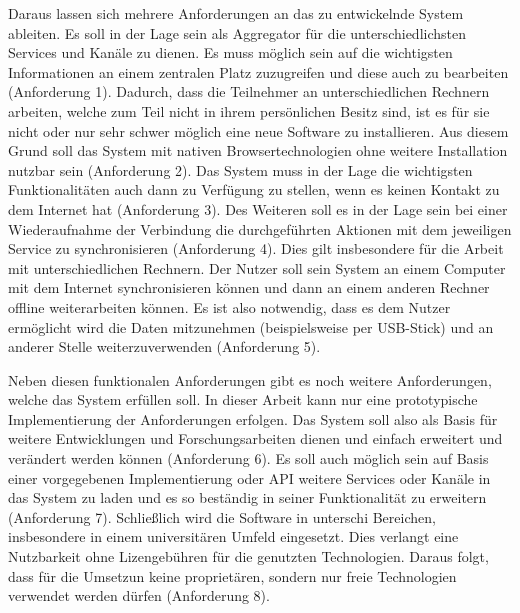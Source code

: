 Daraus lassen sich mehrere Anforderungen an das zu entwickelnde System ableiten. Es soll in der Lage sein als Aggregator für die unterschiedlichsten Services und Kanäle zu dienen. Es muss möglich sein auf die wichtigsten Informationen an einem zentralen Platz zuzugreifen und diese auch zu bearbeiten (Anforderung 1). Dadurch, dass die Teilnehmer an unterschiedlichen Rechnern arbeiten, welche zum Teil nicht in ihrem persönlichen Besitz sind, ist es für sie nicht oder nur sehr schwer möglich eine neue Software zu installieren. Aus diesem Grund soll das System mit nativen Browsertechnologien ohne weitere Installation nutzbar sein (Anforderung 2). Das System muss in der Lage die wichtigsten Funktionalitäten auch dann zu Verfügung zu stellen, wenn es keinen Kontakt zu dem Internet hat (Anforderung 3). Des Weiteren soll es in der Lage sein bei einer Wiederaufnahme der Verbindung die durchgeführten Aktionen mit dem jeweiligen Service zu synchronisieren (Anforderung 4). Dies gilt insbesondere für die Arbeit mit unterschiedlichen Rechnern. Der Nutzer soll sein System an einem Computer mit dem Internet synchronisieren können und dann an einem anderen Rechner offline weiterarbeiten können. Es ist also notwendig, dass es dem Nutzer ermöglicht wird die Daten mitzunehmen (beispielsweise per USB-Stick) und an anderer Stelle weiterzuverwenden (Anforderung 5). 

Neben diesen funktionalen Anforderungen gibt es noch weitere Anforderungen, welche das System erfüllen soll. In dieser Arbeit kann nur eine prototypische Implementierung der Anforderungen erfolgen. Das System soll also als Basis für weitere Entwicklungen und Forschungsarbeiten dienen und einfach erweitert und verändert werden können (Anforderung 6). Es soll auch möglich sein auf Basis einer vorgegebenen Implementierung oder API weitere Services oder Kanäle in das System zu laden und es so beständig in seiner Funktionalität zu erweitern (Anforderung 7). Schließlich wird die Software in unterschi Bereichen, insbesondere in einem universitären Umfeld eingesetzt. Dies verlangt eine Nutzbarkeit ohne Lizengebühren für die genutzten Technologien. Daraus folgt, dass für die Umsetzun keine proprietären, sondern nur freie Technologien verwendet werden dürfen (Anforderung 8). 

